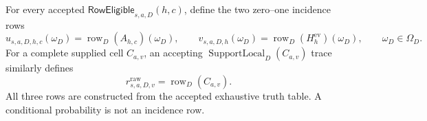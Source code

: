 For every accepted \(\mathsf{RowEligible}_{s,a,D}(h,c)\), define the two zero--one incidence rows
\[
u_{s,a,D,h,c}(\omega_D)=\operatorname{row}_D(A_{h,c})(\omega_D),
\qquad
v_{s,a,D,h}(\omega_D)=\operatorname{row}_D(H_h^{\mathrm{ev}})(\omega_D),
\qquad \omega_D\in\Omega_D.
\]
For a complete supplied cell \(C_{a,v}\), an accepting \(\operatorname{SupportLocal}_D(C_{a,v})\) trace similarly defines
\[
r^{\mathrm{raw}}_{s,a,D,v}=\operatorname{row}_D(C_{a,v}).
\]
All three rows are constructed from the accepted exhaustive truth table.  A conditional probability is not an incidence row.